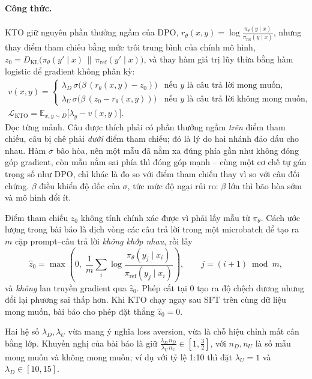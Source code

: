 \paragraph{Công thức.} KTO giữ nguyên phần thưởng ngầm của DPO, \( r_{\theta}(x,y) = \log\frac{\pi_{\theta}(y\mid x)}{\pi_{\text{ref}}(y\mid x)} \), nhưng thay điểm tham chiếu bằng mức trôi trung bình của chính mô hình, \( z_0 = D_{\text{KL}}\big(\pi_\theta(y'\mid x)\,\|\,\pi_{\text{ref}}(y'\mid x)\big) \), và thay hàm giá trị lũy thừa bằng hàm logistic để gradient không phân kỳ:
\[
\begin{gathered}
v(x,y) = \begin{cases}
\lambda_D\, \sigma\big(\beta\,(r_\theta(x,y) - z_0)\big) & \text{nếu } y \text{ là câu trả lời mong muốn},\\
\lambda_U\, \sigma\big(\beta\,(z_0 - r_\theta(x,y))\big) & \text{nếu } y \text{ là câu trả lời không mong muốn},
\end{cases}\\[6pt]
\mathcal{L}_{\text{KTO}} = \mathbb{E}_{x,y \sim D}\big[\lambda_y - v(x,y)\big].
\end{gathered}
\]
Đọc từng mảnh. Câu được thích phải có phần thưởng ngầm \emph{trên} điểm tham chiếu, câu bị chê phải \emph{dưới} điểm tham chiếu; đó là lý do hai nhánh đảo dấu cho nhau. Hàm \( \sigma \) bão hòa, nên một mẫu đã nằm xa đúng phía gần như không đóng góp gradient, còn mẫu nằm sai phía thì đóng góp mạnh -- cùng một cơ chế tự gán trọng số như DPO, chỉ khác là đo so với điểm tham chiếu thay vì so với câu đối chứng. \( \beta \) điều khiển độ dốc của \( \sigma \), tức mức độ ngại rủi ro: \( \beta \) lớn thì bão hòa sớm và mô hình đổi ít.

Điểm tham chiếu \( z_0 \) không tính chính xác được vì phải lấy mẫu từ \( \pi_{\theta} \). Cách ước lượng trong bài báo là dịch vòng các câu trả lời trong một microbatch để tạo ra \( m \) cặp prompt--câu trả lời \emph{không khớp nhau}, rồi lấy
\[
    \hat{z}_0 = \max\!\left( 0,\; \frac{1}{m} \sum_{i} \log \frac{\pi_{\theta}(y_j \mid x_i)}{\pi_{\text{ref}}(y_j \mid x_i)} \right),
    \qquad j = (i+1) \bmod m,
\]
và \emph{không} lan truyền gradient qua \( \hat{z}_0 \). Phép cắt tại 0 tạo ra độ chệch dương nhưng đổi lại phương sai thấp hơn. Khi KTO chạy ngay sau SFT trên cùng dữ liệu mong muốn, bài báo cho phép đặt thẳng \( \hat{z}_0 = 0 \).

Hai hệ số \( \lambda_D, \lambda_U \) vừa mang ý nghĩa loss aversion, vừa là chỗ hiệu chỉnh mất cân bằng lớp. Khuyến nghị của bài báo là giữ \( \frac{\lambda_D\, n_D}{\lambda_U\, n_U} \in \left[1, \tfrac{3}{2}\right] \), với \( n_D, n_U \) là số mẫu mong muốn và không mong muốn; ví dụ với tỷ lệ 1:10 thì đặt \( \lambda_U = 1 \) và \( \lambda_D \in [10, 15] \).

